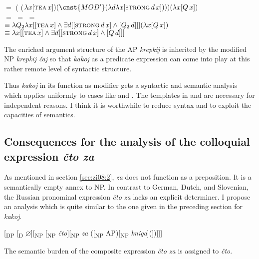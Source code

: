 \documentclass[output=paper,colorlinks,citecolor=brown]{langscibook}
\begin{document}
\ea \label{ex:zi08:42} \\
$=$ ( ($\lambda x  [\textsc{tea}\, x])(\cnst{MOD'} (\lambda d \lambda x [\textsc{strong}\, d\, x])))(\lambda x [Q\, x])$\\ 
\hspace{41pt} $=$  \hspace{55pt} $=$  \hspace{35pt} $=$ \\ 
$\equiv \lambda Q_2 \lambda x [[\textsc{tea}\, x] \wedge \exists d [[\textsc{strong}\, d\, x] \wedge [Q_2\, d]]](\lambda x [Q\, x])$\\ 
$\equiv \lambda x [[\textsc{tea}\, x] \wedge \exists d [[\textsc{strong}\, d\, x] \wedge [Q\, d]]]$
\z

\noindent The enriched argument structure of the AP \textit{krepkij} is inherited by the modified NP \textit{krepkij čaj} so that \textit{kakoj} as a predicate expression can come into play at this rather remote level of syntactic structure.

Thus \textit{kakoj} in its function as modifier gets a syntactic and semantic analysis which applies uniformly to cases like  and . The templates in  and  are necessary for independent reasons. I think it is worthwhile to reduce syntax and to exploit the capacities of semantics.

\subsection{Consequences for the analysis of the colloquial expression \textit{čto za}} \label{subsec3.3}

As mentioned in section \ref{sec:zi08:2}, \textit{za} does not function as a preposition. It is a semantically empty annex to NP. In contrast to German, Dutch, and Slovenian, the Russian pronominal expression \textit{čto za} lacks an explicit determiner. I propose an analysis which is quite similar to the one given in the preceding section for \textit{kakoj}.

\ea \label{ex:zi08:43} [\textsubscript{DP} [\textsubscript{D} $\varnothing$][\textsubscript{NP} [\textsubscript{NP} \textit{čto}][\textsubscript{NP} \textit{za} ([\textsubscript{NP} AP)[\textsubscript{NP} \textit{kniga}](])]]]
\z

\noindent The semantic burden of the composite expression \textit{čto za} is assigned to \textit{čto}.
\end{document}
